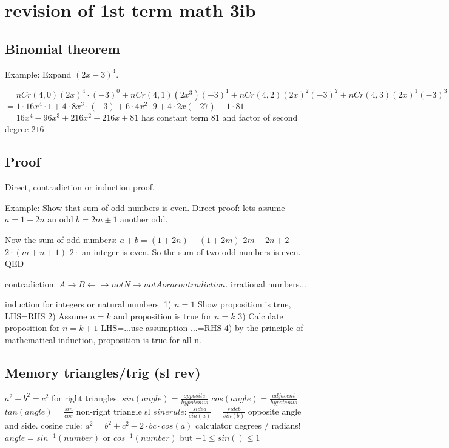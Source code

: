 \section{revision of 1st term math 3ib}

\subsection{Binomial theorem}

Example: Expand $(2x-3)^4$.

$=nCr(4,0)(2x)^4\cdot(-3)^0+nCr(4,1)(2x^3)(-3)^1+nCr(4,2)(2x)^2(-3)^2+nCr(4,3)(2x)^1(-3)^3+nCr(4,4)(2x)^0(-3)^4$
$=1\cdot16x^4\cdot 1 + 4\cdot 8x^3\cdot(-3) + 6\cdot 4x^2\cdot 9 + 4\cdot 2x(-27) + 1\cdot 81$
$=16x^4-96x^3+216x^2-216x+81$
has constant term $81$
and factor of second degree $216$

\subsection{Proof}
Direct, contradiction or induction proof.

Example: Show that sum of odd numbers is even.
Direct proof: lets assume
$a=1+2n$ an odd
$b=2m\pm1$ another odd.

Now the sum of odd numbers:
$a+b=(1+2n)+(1+2m)$
$2m+2n+2$
$2\cdot(m+n+1)$
$2\cdot$ an integer is even.
So the sum of two odd numbers is even.
QED

contradiction:
$A\rightarrow B \leftarrow\rightarrow not N\rightarrow not A or a contradiction$.
irrational numbers...

induction for integers or natural numbers.
1) $n=1$ Show proposition is true, LHS=RHS
2) Assume $n=k$ and proposition is true for $n=k$
3) Calculate proposition for $n=k+1$
LHS=...use assumption ...=RHS
4) by the principle of mathematical induction, proposition is true for all n.

\subsection{Memory triangles/trig (sl rev)}
$a^2+b^2=c^2$ for right triangles.
$sin(angle)=\frac{opposite}{hypotenus}$
$cos(angle)=\frac{adjacent}{hypotenus}$
$tan(angle)=\frac{sin}{cos}$
non-right triangle sl
$sine rule: \frac{side a}{sin(a)}=\frac{side b}{sin(b)}$ opposite angle and side.
cosine rule: $a^2=b^2+c^2-2\cdot bc\cdot cos(a)$
calculator degrees / radians!
$angle=sin^{-1}(number)$ or $cos^{-1}(number)$
but $-1\leq sin() \leq 1$


